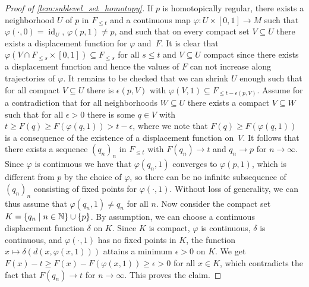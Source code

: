 \begin{proof}[Proof of \cref{lem:sublevel_set_homotopy}]
	If $p$ is homotopically regular, there exists a neighborhood $U$ of $p$ in $F_{\leq t}$ and a continuous map $\varphi \colon U \times [0,1] \to M$ such that $\varphi(\cdot,0) = \operatorname{id}_{U}$, $\varphi(p,1) \neq p$, and such that on every compact set $V \subseteq U$ there exists a displacement function for $\varphi$ and~$F$.
	It is clear that $\varphi(V \cap F_{\leq s} \times [0,1]) \subseteq F_{\leq s}$ for all $s \leq t$ and $V \subseteq U$ compact since there exists a displacement function and hence the values of $F$ can not increase along trajectories of $\varphi$.
	It remains to be checked that we can shrink $U$ enough such that for all compact $V \subseteq U$ there is $\epsilon(p,V)$ with $\varphi(V,1) \subseteq F_{\leq t - \epsilon(p,V)}$.
	Assume for a contradiction that for all neighborhoods $W \subseteq U$ there exists a compact $V \subseteq W$ such that for all $\epsilon > 0$ there is some $q \in V$ with $t \geq F(q) \geq F(\varphi(q,1)) > t - \epsilon$, where we note that $F(q) \geq F(\varphi(q,1))$ is a consequence of the existence of a displacement function on~$V$.
	It follows that there exists a sequence $(q_{n})_{n}$ in $F_{\leq t}$ with $F(q_{n}) \to t$ and $q_{n} \to p$ for $n \to \infty$.
	Since $\varphi$ is continuous we have that $\varphi(q_{n},1)$ converges to $\varphi(p,1)$, which is different from $p$ by the choice of $\varphi$, so there can be no infinite subsequence of $(q_{n})_{n}$ consisting of fixed points for $\varphi(\cdot,1)$.
	Without loss of generality, we can thus assume that $\varphi(q_{n},1) \neq q_{n}$ for all $n$.
	Now consider the compact set $K = \{q_{n} \mid n \in \mathbb{N} \} \cup \{p\}$.
	By assumption, we can choose a continuous displacement function $\delta$ on $K$.
	Since $K$ is compact, $\varphi$ is continuous, $\delta$ is continuous, and $\varphi(\cdot,1)$ has no fixed points in $K$, the function $x \mapsto \delta(d(x,\varphi(x,1)))$ attains a minimum $\epsilon > 0$ on $K$.
	We get $F(x) - t \geq F(x) - F(\varphi(x,1)) \geq \epsilon > 0$ for all $x \in K$, which contradicts the fact that $F(q_{n}) \to t$ for $n \to \infty$.
	This proves the claim.


\end{proof}
